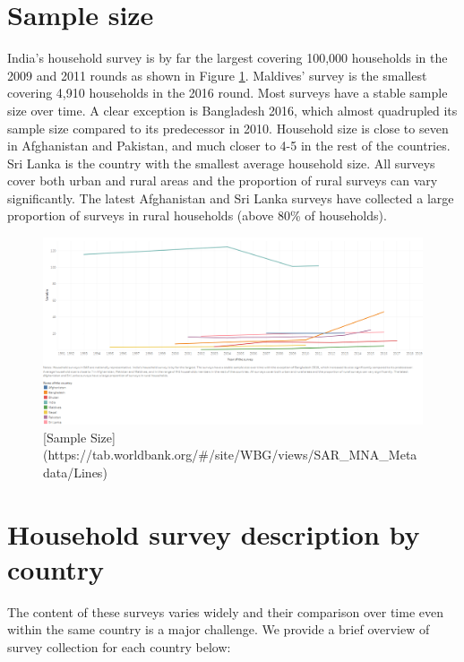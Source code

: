 \documentclass[13 pt,]{book}
\begin{document}
\section{Sample size}\label{sample-size}

India's household survey is by far the largest covering 100,000
households in the 2009 and 2011 rounds as shown in Figure
\ref{fig:ssize}. Maldives' survey is the smallest covering 4,910
households in the 2016 round. Most surveys have a stable sample size
over time. A clear exception is Bangladesh 2016, which almost quadrupled
its sample size compared to its predecessor in 2010. Household size is
close to seven in Afghanistan and Pakistan, and much closer to 4-5 in
the rest of the countries. Sri Lanka is the country with the smallest
average household size. All surveys cover both urban and rural areas and
the proportion of rural surveys can vary significantly. The latest
Afghanistan and Sri Lanka surveys have collected a large proportion of
surveys in rural households (above 80\% of households).

\begin{figure}

{\centering \includegraphics[width=21.19in]{figures/Survey_size} 

}

\caption{[Sample Size](https://tab.worldbank.org/#/site/WBG/views/SAR_MNA_Metadata/Lines)}\label{fig:ssize}
\end{figure}

\section{Household survey description by
country}\label{household-survey-description-by-country}

The content of these surveys varies widely and their comparison over
time even within the same country is a major challenge. We provide a
brief overview of survey collection for each country below:
\end{document}
